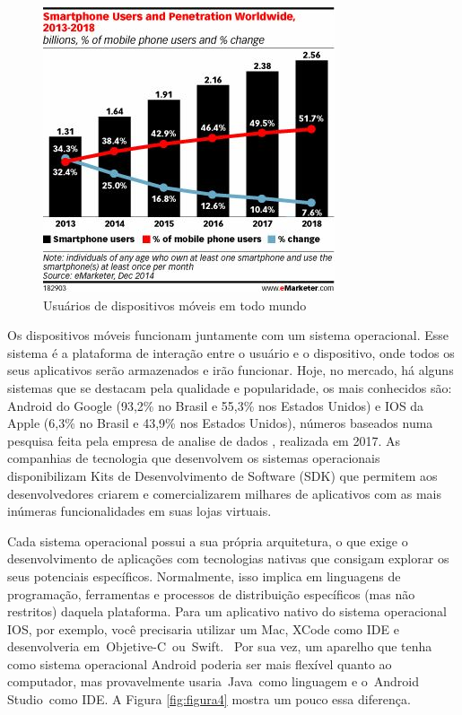 \begin{figure}[H]
	\caption{\label{fig:figura3}Usuários de dispositivos móveis em todo mundo}
	\centering
	\includegraphics[scale=0.5]{imagens/figura3.jpg}
\end{figure}

Os dispositivos móveis funcionam juntamente com um sistema operacional. Esse sistema é a plataforma de interação entre o usuário e o dispositivo, onde todos os seus aplicativos serão armazenados e irão funcionar. Hoje, no mercado, há alguns sistemas que se destacam pela qualidade e popularidade, os mais conhecidos são: Android do Google (93,2\% no Brasil e 55,3\% nos Estados Unidos) e IOS da Apple (6,3\% no Brasil e 43,9\% nos Estados Unidos), números baseados numa pesquisa feita pela empresa de analise de dados \citeauthor{kantar}, realizada em 2017. As companhias de tecnologia que desenvolvem os sistemas operacionais disponibilizam Kits de Desenvolvimento de Software (SDK) que permitem aos desenvolvedores criarem e comercializarem milhares de aplicativos com as mais inúmeras funcionalidades em suas lojas virtuais. 

Cada sistema operacional possui a sua própria arquitetura, o que exige o desenvolvimento de aplicações com tecnologias nativas que consigam explorar os seus potenciais específicos. Normalmente, isso implica em linguagens de programação, ferramentas e processos de distribuição específicos (mas não restritos) daquela plataforma. Para um aplicativo nativo do sistema operacional IOS, por exemplo, você precisaria utilizar um Mac, XCode como IDE e desenvolveria em Objetive-C ou Swift.  Por sua vez, um aparelho que tenha como sistema operacional Android poderia ser mais flexível quanto ao computador, mas provavelmente usaria Java como linguagem e o Android Studio como IDE. A Figura \ref{fig:figura4} mostra um pouco essa diferença.

